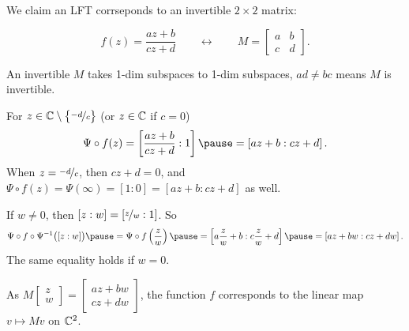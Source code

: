 \documentclass[10pt,aspectratio=169]{beamer}
\begin{document}
\begin{frame}
We claim an LFT corrseponds to an invertible $2 \times 2$ matrix:

\[
f(z) = \frac{a z + b}{c z + d}
\qquad
\leftrightarrow
\qquad
M =
\begin{bmatrix}
a & b \\
c & d
\end{bmatrix} .
\]

\pause

An invertible $M$ takes 1-dim subspaces to 1-dim subspaces,
$ad\not=bc$ means $M$ is invertible.

\medskip
\pause

For $z \in {\mathbb{C}} \setminus \bigl\{ \nicefrac{-d}{c} \bigr\}$ (or $z \in {\mathbb{C}}$ if $c=0$)
\[
\Psi \circ f(z) =
\left[\frac{a z + b}{c z + d}: 1 \right]
\pause
=
\left[a z + b: c z + d \right] .
\]
\pause
When $z = \nicefrac{-d}{c}$, then $cz+d = 0$, and
$\Psi\circ f(z) = \Psi(\infty) = [1:0] = [az+b : cz+d]$ as well.

\medskip
\pause

If $w \not= 0$, then $[z:w] = [ \nicefrac{z}{w}:1 ]$.
\pause
So
\[
\Psi \circ f \circ \Psi^{-1} \bigl([z:w]\bigr)
\pause
=
\Psi \circ f \left(\frac{z}{w}\right)
\pause
=
\left[a \frac{z}{w} + b : c \frac{z}{w} + d \right]
\pause
=
\left[a z + b w: c z + d w \right] .
\]
\pause
The same equality holds if $w=0$.

\medskip
\pause

As
$M \left[ \begin{smallmatrix} z \\ w \end{smallmatrix} \right]
= \left[ \begin{smallmatrix} 
a z + b w \\ c z + d w
\end{smallmatrix} \right]$,
the function $f$ corresponds to the linear map $v \mapsto Mv$ on ${\mathbb{C}}^2$.

\end{frame}
\end{document}
